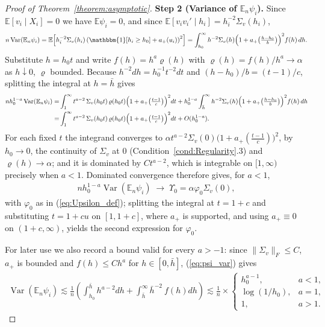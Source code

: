\documentclass{article}
\newcommand{\normm}[1]{\lVert#1\rVert}
\newcommand{\E}{\mathbb{E}}
\newcommand{\I}{\mathbbm{1}}
\DeclareMathOperator{\Var}{Var}
\begin{document}
\begin{appendices}
\begin{proof}[Proof of Theorem~\ref{theorem:asymptotic}]
\textbf{Step 2 (Variance of $\E_n\psi_i$).}
Since $\E[v_i\mid X_i]=0$ we have $\E\psi_i=0$, and since
$\E[v_iv_i'\mid h_i]=h_i^{-2}\Sigma_v(h_i)$,
\begin{align}\label{eq:psi_var}
    n\Var\!\left(\E_n\psi_i\right)
    = \E\!\left[h_i^{-2}\Sigma_v(h_i)
      \left(\I[h_i\ge h_0]+a_{+}(u_i)\right)^{2}\right]
    = \int_{h_0}^{\infty} h^{-2}\Sigma_v(h)
      \Big(1+a_{+}\big(\tfrac{h-h_0}{b}\big)\Big)^{2}f(h)\,dh .
\end{align}
Substitute $h=h_0t$ and write $f(h)=h^{a}\varrho(h)$ with
$\varrho(h)=f(h)/h^{a}\to\alpha$ as $h\downarrow0$, $\varrho$ bounded. Because
$h^{-2}dh=h_0^{-1}t^{-2}dt$ and $(h-h_0)/b=(t-1)/c$, splitting the integral at $h=\bar h$ gives
\begin{align}\label{eq:psi_var_scaled}
    n h_0^{1-a}\Var\!\left(\E_n\psi_i\right)
    =& \int_{1}^{\infty}t^{a-2}\,\Sigma_v(h_0t)\,\varrho(h_0t)
      \Big(1+a_{+}\big(\tfrac{t-1}{c}\big)\Big)^{2}dt + h_0^{1-a}\int_{\bar h}^{\infty} h^{-2}\Sigma_v(h)
      \Big(1+a_{+}\big(\tfrac{h-h_0}{b}\big)\Big)^{2}f(h)\,dh \notag\\
    =& \int_{1}^{\infty}t^{a-2}\,\Sigma_v(h_0t)\,\varrho(h_0t)
      \Big(1+a_{+}\big(\tfrac{t-1}{c}\big)\Big)^{2}dt + O(h_0^{1-a}).
\end{align}
For each fixed $t$ the integrand converges to
$\alpha t^{a-2}\Sigma_v(0)\big(1+a_{+}(\tfrac{t-1}{c})\big)^{2}$, by $h_0\to0$,
the continuity of $\Sigma_v$ at $0$ (Condition~\ref{cond:Regularity}.3) and
$\varrho(h)\to\alpha$; and it is dominated by $Ct^{a-2}$, which is integrable on
$[1,\infty)$ precisely when $a<1$. Dominated convergence therefore gives, for
$a<1$,
\begin{align}\label{eq:Upsilon_limit}
    n h_0^{1-a}\Var\!\left(\E_n\psi_i\right)\;\longrightarrow\;\Upsilon_0
    =\alpha\varphi_0\Sigma_v(0),
\end{align}
with $\varphi_0$ as in (\ref{eq:Upsilon_def}); splitting the integral at
$t=1+c$ and substituting $t=1+cu$ on $[1,1+c]$, where $a_{+}$ is supported, and
using $a_{+}\equiv0$ on $(1+c,\infty)$, yields the second expression for
$\varphi_0$.
 
For later use we also record a bound valid for every $a>-1$: since
$\normm{\Sigma_v}_F\le C$, $a_{+}$ is bounded and $f(h)\le C h^{a}$ for $h\in[0,\bar{h}]$,
(\ref{eq:psi_var}) gives
\begin{align}\label{eq:psi_var_bound}
    \Var\!\left(\E_n\psi_i\right)
    \lesssim \frac{1}{n}(\int_{h_0}^{\bar h}h^{a-2}dh+\int_{\bar h}^{\infty}\bar{h}^{-2}\ f(h)dh)
    \lesssim \frac{1}{n}\times
    \begin{cases}
        h_0^{a-1}, & a<1,\\
        \log(1/h_0), & a=1,\\
        1, & a>1 .
    \end{cases}
\end{align}


\end{proof}
\end{appendices}
\end{document}
